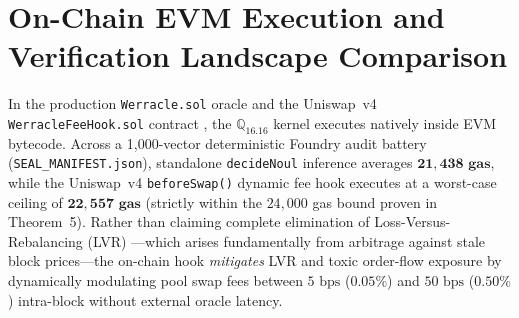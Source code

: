 \documentclass[10pt,a4paper]{article}
\begin{document}
\section{On-Chain EVM Execution and Verification Landscape Comparison}

In the production \texttt{Werracle.sol} oracle and the Uniswap~v4 \texttt{WerracleFeeHook.sol} contract \cite{dagli2026werracle}, the $\mathbb{Q}_{16.16}$ kernel executes natively inside EVM bytecode. Across a 1,000-vector deterministic Foundry audit battery (\texttt{SEAL\_MANIFEST.json}), standalone \texttt{decideNoul} inference averages $\mathbf{21,438\text{ gas}}$, while the Uniswap~v4 \texttt{beforeSwap()} dynamic fee hook executes at a worst-case ceiling of $\mathbf{22,557\text{ gas}}$ (strictly within the $24,000$ gas bound proven in Theorem~5). Rather than claiming complete elimination of Loss-Versus-Rebalancing (LVR) \cite{milionis2022}---which arises fundamentally from arbitrage against stale block prices---the on-chain hook \emph{mitigates} LVR and toxic order-flow exposure by dynamically modulating pool swap fees between $5\text{ bps}$ ($0.05\%$) and $50\text{ bps}$ ($0.50\%$) intra-block without external oracle latency.

\begin{table}[htbp]
\centering
\caption{Comparison of Formal Neural Verification Frameworks and On-Chain Inference Paradigms.}
\label{tab:comparison}
\end{table}
\end{document}
